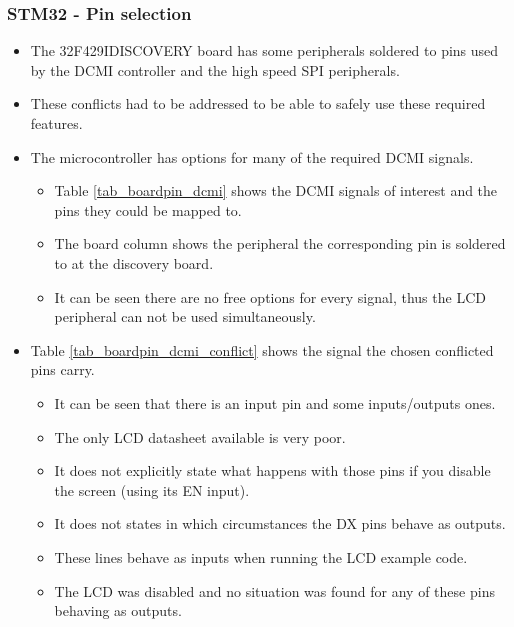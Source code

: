 
\subsubsection{STM32 - Pin selection}
\begin{itemize}
	\item The 32F429IDISCOVERY board has some peripherals soldered to pins used by the DCMI controller and the high speed SPI peripherals.
	\item These conflicts had to be addressed to be able to safely use these required features.
	\item The microcontroller has options for many of the required DCMI signals.
	\begin{itemize}
		\item Table \ref{tab_boardpin_dcmi} shows the DCMI signals of interest and the pins they could be mapped to.
		\item The board column shows the peripheral the corresponding pin is soldered to at the discovery board.
		\item It can be seen there are no free options for every signal, thus the LCD peripheral can not be used simultaneously. 
	\end{itemize}
\end{itemize}

\begin{itemize}
	\item Table \ref{tab_boardpin_dcmi_conflict} shows the signal the chosen conflicted pins carry.
	\begin{itemize}
		\item It can be seen that there is an input pin and some inputs/outputs ones.
		\item The only LCD datasheet available is very poor.
		\item It does not explicitly state what happens with those pins if you disable the screen (using its EN input).
		\item It does not states in which circumstances the DX pins behave as outputs.
		\item These lines behave as inputs when running the LCD example code.
		\item The LCD was disabled and no situation was found for any of these pins behaving as outputs.
	\end{itemize}

\end{itemize}

